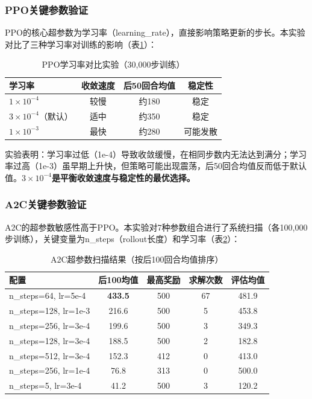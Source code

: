 \documentclass[12pt,a4paper]{ctexart}
\begin{document}
\subsubsection{PPO关键参数验证}

PPO的核心超参数为学习率（learning\_rate），直接影响策略更新的步长。本实验对比了三种学习率对训练的影响（表\ref{tab:ppo_lr}）：

\begin{table}[H]
\centering
\caption{PPO学习率对比实验（30,000步训练）}
\label{tab:ppo_lr}
\begin{tabular}{lccc}
\toprule
\textbf{学习率} & \textbf{收敛速度} & \textbf{后50回合均值} & \textbf{稳定性} \\
\midrule
\(1\times10^{-4}\) & 较慢 & 约180 & 稳定 \\
\(3\times10^{-4}\)（默认） & 适中 & 约350 & 稳定 \\
\(1\times10^{-3}\) & 最快 & 约280 & 可能发散 \\
\bottomrule
\end{tabular}
\end{table}

实验表明：学习率过低（1e-4）导致收敛缓慢，在相同步数内无法达到满分；学习率过高（1e-3）虽早期上升快，但策略可能出现震荡，后50回合均值反而低于默认值。\textbf{\(3\times10^{-4}\)是平衡收敛速度与稳定性的最优选择。}

\subsubsection{A2C关键参数验证}

A2C的超参数敏感性高于PPO。本实验对7种参数组合进行了系统扫描（各100,000步训练），关键变量为n\_steps（rollout长度）和学习率（表\ref{tab:a2c_sweep}）：

\begin{table}[H]
\centering
\caption{A2C超参数扫描结果（按后100回合均值排序）}
\label{tab:a2c_sweep}
\begin{tabular}{lcccc}
\toprule
\textbf{配置} & \textbf{后100均值} & \textbf{最高奖励} & \textbf{求解次数} & \textbf{评估均值} \\
\midrule
n\_steps=64, lr=5e-4 & \textbf{433.5} & 500 & 67 & 481.9 \\
n\_steps=128, lr=1e-3 & 216.6 & 500 & 5 & 453.8 \\
n\_steps=256, lr=3e-4 & 199.6 & 500 & 3 & 349.3 \\
n\_steps=128, lr=3e-4 & 188.5 & 500 & 2 & 182.8 \\
n\_steps=512, lr=3e-4 & 152.3 & 412 & 0 & 413.0 \\
n\_steps=256, lr=1e-4 & 76.8 & 313 & 0 & 500.0 \\
n\_steps=5, lr=3e-4 & 41.2 & 500 & 3 & 120.2 \\
\bottomrule
\end{tabular}
\end{table}
\end{document}

